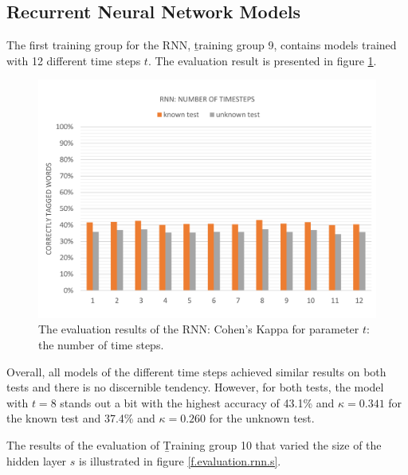 \subsection{Recurrent Neural Network Models}\label{c.evaluation.results.rnn}
The first training group for the RNN, \b{training group 9}, contains models trained with 12 different time steps $t$. The evaluation result is presented in figure \ref{f.evaluation.rnn.t}.

\begin{figure}[H]
	\hspace{-5mm}\includegraphics[width=1.07\textwidth]{images/evaluation_rnn_t}
	\caption[RNN Evaluation: Number of Time Steps]{The evaluation results of the RNN: Cohen's Kappa for parameter $t$: the number of time steps.}
	\label{f.evaluation.rnn.t}
\end{figure}

Overall, all models of the different time steps achieved similar results on both tests and there is no discernible tendency. However, for both tests, the model with $t=8$ stands out a bit with the highest accuracy of 43.1\% and $\kappa=0.341$ for the known test and 37.4\% and $\kappa=0.260$ for the unknown test.

The results of the evaluation of \b{Training group 10} that varied the size of the hidden layer $s$ is illustrated in figure \ref{f.evaluation.rnn.s}.

